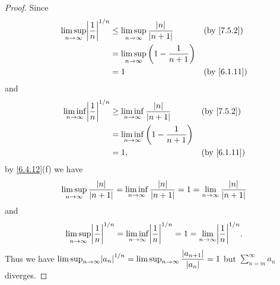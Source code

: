 \begin{proof}
  Since
  \begin{align*}
    \limsup_{n \to \infty} \abs{\dfrac{1}{n}}^{1 / n} & \leq \limsup_{n \to \infty} \dfrac{\abs{n}}{\abs{n + 1}}  &  & \text{(by \cref{7.5.2})}  \\
                                                      & = \limsup_{n \to \infty} \bigg(1 - \dfrac{1}{n + 1}\bigg)                                \\
                                                      & = 1                                                       &  & \text{(by \cref{6.1.11})}
  \end{align*}
  and
  \begin{align*}
    \liminf_{n \to \infty} \abs{\dfrac{1}{n}}^{1 / n} & \geq \liminf_{n \to \infty} \dfrac{\abs{n}}{\abs{n + 1}}  &  & \text{(by \cref{7.5.2})}  \\
                                                      & = \liminf_{n \to \infty} \bigg(1 - \dfrac{1}{n + 1}\bigg)                                \\
                                                      & = 1,                                                      &  & \text{(by \cref{6.1.11})}
  \end{align*}
  by \cref{6.4.12}(f) we have
  \[
    \limsup_{n \to \infty} \dfrac{\left\lvert n\right\rvert}{\left\lvert n + 1\right\rvert} = \liminf_{n \to \infty} \dfrac{\left\lvert n\right\rvert}{\left\lvert n + 1\right\rvert} = 1 = \lim_{n \to \infty} \dfrac{\left\lvert n\right\rvert}{\left\lvert n + 1\right\rvert}
  \]
  and
  \[
    \limsup_{n \to \infty} \abs{\dfrac{1}{n}}^{1 / n} = \liminf_{n \to \infty} \abs{\dfrac{1}{n}}^{1 / n} = 1 = \lim_{n \to \infty} \abs{\dfrac{1}{n}}^{1 / n}.
  \]
  Thus we have \(\limsup_{n \to \infty} \abs{a_n}^{1 / n} = \limsup_{n \to \infty} \dfrac{\abs{a_{n + 1}}}{\abs{a_n}} = 1\) but \(\sum_{n = m}^\infty a_n\) diverges.


\end{proof}
